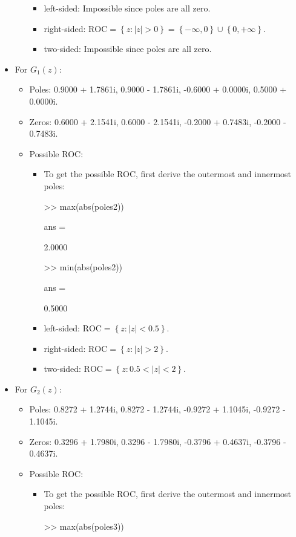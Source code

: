 \documentclass[onecolumn,oneside]{SUSTechHomework}
\begin{document}
\begin{itemize}
\begin{itemize}
\begin{itemize}
            \item left-sided: Impossible since poles are all zero.
            \item right-sided: $\text{ROC}=\left\{z:|z|>0\right\}=\left\{-\infty,0\right\}\cup\left\{0,+\infty\right\} $.
            \item two-sided: Impossible since poles are all zero.
        \end{itemize}
    \end{itemize}
    \item For $G_1(z)$:
    \begin{itemize}
        \item Poles: 0.9000 + 1.7861i, 0.9000 - 1.7861i, -0.6000 + 0.0000i, 0.5000 + 0.0000i.
        \item Zeros: 0.6000 + 2.1541i, 0.6000 - 2.1541i, -0.2000 + 0.7483i, -0.2000 - 0.7483i.
        \item Possible ROC:
        \begin{itemize}
            \item To get the possible ROC, first derive the outermost and innermost poles:
\begin{commandline}
    >> max(abs(poles2))

    ans =
    
        2.0000
    
    >> min(abs(poles2))
    
    ans =
    
        0.5000
\end{commandline}            
            \item left-sided: $\text{ROC}=\left\{z:|z|<0.5\right\}$.
            \item right-sided: $\text{ROC}=\left\{z:|z|>2\right\}$.
            \item two-sided: $\text{ROC}=\left\{z:0.5<|z|<2\right\}$.
        \end{itemize}
    \end{itemize}
    \item For $G_2(z)$:
    \begin{itemize}
        \item Poles: 0.8272 + 1.2744i, 0.8272 - 1.2744i, -0.9272 + 1.1045i, -0.9272 - 1.1045i.
        \item Zeros: 0.3296 + 1.7980i, 0.3296 - 1.7980i, -0.3796 + 0.4637i, -0.3796 - 0.4637i.
        \item Possible ROC:
        \begin{itemize}
            \item To get the possible ROC, first derive the outermost and innermost poles:
\begin{commandline}
    >> max(abs(poles3))


\end{commandline}
\end{itemize}
\end{itemize}
\end{itemize}
\end{document}
